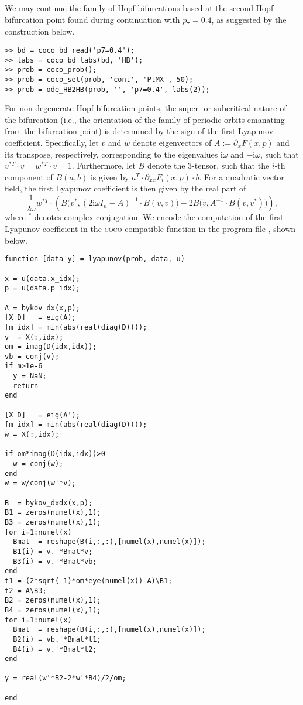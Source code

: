 We may continue the family of Hopf bifurcations based at the second Hopf bifurcation point found during continuation with $p_7=0.4$, as suggested by the construction below.
\begin{lstlisting}[language=coco-highlight]
>> bd = coco_bd_read('p7=0.4');
>> labs = coco_bd_labs(bd, 'HB');
>> prob = coco_prob();
>> prob = coco_set(prob, 'cont', 'PtMX', 50);
>> prob = ode_HB2HB(prob, '', 'p7=0.4', labs(2));
\end{lstlisting}
For non-degenerate Hopf bifurcation points, the super- or subcritical nature of the bifurcation (i.e., the orientation of the family of periodic orbits emanating from the bifurcation point) is determined by the sign of the first Lyapunov coefficient. Specifically, let $v$ and $w$ denote eigenvectors of $A:=\partial_x F(x,p)$ and its transpose, respectively,  corresponding to the eigenvalues $\mathrm{i}\omega$ and $-\mathrm{i}\omega$, such that $v^{\ast T}\cdot v=w^{\ast T}\cdot v=1$. Furthermore, let $B$ denote the 3-tensor, such that the $i$-th component of $B(a,b)$ is given by $a^T\cdot\partial_{xx}F_i(x,p)\cdot b$. For a quadratic vector field, the first Lyapunov coefficient is then given by the real part of
\begin{equation}
\frac{1}{2\omega}w^{\ast T}\cdot\left(B\big(v^\ast,(2\mathrm{i}\omega I_n-A)^{-1}\cdot B(v,v)\big)-2B\big(v,A^{-1}\cdot B(v,v^\ast)\big)\right),
\end{equation}
where $^\ast$ denotes complex conjugation. We encode the computation of the first Lyapunov coefficient in the \textsc{coco}-compatible function  in the program file , shown below.
\begin{lstlisting}[language=coco-highlight]
function [data y] = lyapunov(prob, data, u)

x = u(data.x_idx);
p = u(data.p_idx);

A = bykov_dx(x,p);
[X D]   = eig(A);
[m idx] = min(abs(real(diag(D))));
v  = X(:,idx);
om = imag(D(idx,idx));
vb = conj(v);
if m>1e-6
  y = NaN;
  return
end

[X D]   = eig(A');
[m idx] = min(abs(real(diag(D))));
w = X(:,idx);

if om*imag(D(idx,idx))>0
  w = conj(w);
end
w = w/conj(w'*v);

B  = bykov_dxdx(x,p);
B1 = zeros(numel(x),1);
B3 = zeros(numel(x),1);
for i=1:numel(x)
  Bmat  = reshape(B(i,:,:),[numel(x),numel(x)]);
  B1(i) = v.'*Bmat*v;
  B3(i) = v.'*Bmat*vb;
end
t1 = (2*sqrt(-1)*om*eye(numel(x))-A)\B1;
t2 = A\B3;
B2 = zeros(numel(x),1);
B4 = zeros(numel(x),1);
for i=1:numel(x)
  Bmat  = reshape(B(i,:,:),[numel(x),numel(x)]);
  B2(i) = vb.'*Bmat*t1;
  B4(i) = v.'*Bmat*t2;
end

y = real(w'*B2-2*w'*B4)/2/om;

end
\end{lstlisting}
